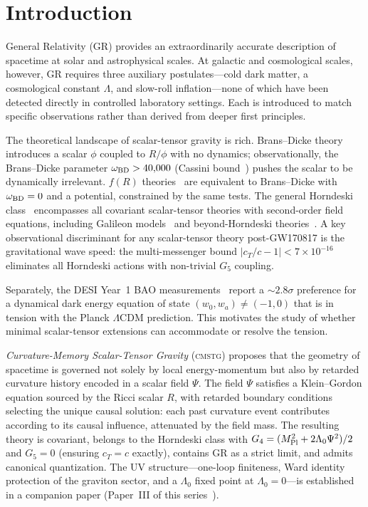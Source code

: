 \documentclass[12pt,a4paper]{article}
\newcommand{\CMSTG}{\textsc{cmstg}}
\newcommand{\Lz}{\Lambda_0}
\begin{document}
\tableofcontents
\bigskip

\section{Introduction}
\label{sec:intro}

General Relativity (GR) provides an extraordinarily accurate description of
spacetime at solar and astrophysical scales. At galactic and cosmological
scales, however, GR requires three auxiliary postulates---cold dark matter, a
cosmological constant $\Lambda$, and slow-roll inflation---none of which have
been detected directly in controlled laboratory settings. Each is introduced
to match specific observations rather than derived from deeper first principles.

The theoretical landscape of scalar-tensor gravity is rich. Brans--Dicke
theory~\cite{BransDicke1961} introduces a scalar $\phi$ coupled to $R/\phi$
with no dynamics; observationally, the Brans--Dicke parameter $\omega_{\rm BD}
> 40{,}000$ (Cassini bound~\cite{Bertotti2003}) pushes the scalar to be
dynamically irrelevant. $f(R)$ theories~\cite{Sotiriou2010} are equivalent to
Brans--Dicke with $\omega_{\rm BD} = 0$ and a potential, constrained by
the same tests. The general Horndeski class~\cite{Horndeski1974,Kobayashi2011}
encompasses all covariant scalar-tensor theories with second-order field
equations, including Galileon models~\cite{Nicolis2009} and beyond-Horndeski
theories~\cite{Gleyzes2015}. A key observational discriminant for any scalar-tensor
theory post-GW170817 is the gravitational wave speed: the multi-messenger
bound $|c_T/c - 1| < 7\times10^{-16}$~\cite{Abbott2017,Creminelli2017}
eliminates all Horndeski actions with non-trivial $G_5$ coupling.

Separately, the DESI Year~1 BAO measurements~\cite{DESI2024} report a
$\sim2.8\sigma$ preference for a dynamical dark energy equation of state
$(w_0, w_a) \neq (-1, 0)$ that is in tension with the Planck $\Lambda$CDM
prediction. This motivates the study of whether minimal scalar-tensor extensions
can accommodate or resolve the tension.

\emph{Curvature-Memory Scalar-Tensor Gravity} (\CMSTG) proposes that the
geometry of spacetime is governed not solely by local energy-momentum but also
by retarded curvature history encoded in a scalar field $\Psi$. The field
$\Psi$ satisfies a Klein--Gordon equation sourced by the Ricci scalar $R$, with
retarded boundary conditions selecting the unique causal solution: each past
curvature event contributes according to its causal influence, attenuated by
the field mass. The resulting theory is covariant, belongs to the Horndeski
class with $G_4 = (M_{\rm Pl}^2 + 2\Lz\Psi^2)/2$ and $G_5 = 0$
(ensuring $c_T = c$ exactly), contains GR as a strict limit, and admits
canonical quantization. The UV structure---one-loop finiteness, Ward identity
protection of the graviton sector, and a $\Lz$ fixed point at
$\Lz = 0$---is established in a companion paper (Paper~III of this series~\cite{WilsonPaperIII}).
\end{document}
